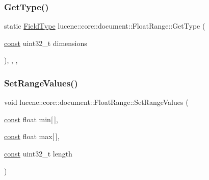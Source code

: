 \subsubsection{\texorpdfstring{Get\+Type()}{GetType()}}
{\footnotesize\ttfamily static \mbox{\hyperlink{classlucene_1_1core_1_1document_1_1FieldType}{Field\+Type}} lucene\+::core\+::document\+::\+Float\+Range\+::\+Get\+Type (\begin{DoxyParamCaption}\item[{\mbox{\hyperlink{ZlibCrc32_8h_a2c212835823e3c54a8ab6d95c652660e}{const}} uint32\+\_\+t}]{dimensions }\end{DoxyParamCaption})\hspace{0.3cm}{\ttfamily [inline]}, {\ttfamily [static]}, {\ttfamily [private]}, {\ttfamily [noexcept]}}

\mbox{\label{classlucene_1_1core_1_1document_1_1FloatRange_af9827075d0e5277455e9cadd16e79f6d}} 
\subsubsection{\texorpdfstring{Set\+Range\+Values()}{SetRangeValues()}}
{\footnotesize\ttfamily void lucene\+::core\+::document\+::\+Float\+Range\+::\+Set\+Range\+Values (\begin{DoxyParamCaption}\item[{\mbox{\hyperlink{ZlibCrc32_8h_a2c212835823e3c54a8ab6d95c652660e}{const}} float}]{min\mbox{[}$\,$\mbox{]},  }\item[{\mbox{\hyperlink{ZlibCrc32_8h_a2c212835823e3c54a8ab6d95c652660e}{const}} float}]{max\mbox{[}$\,$\mbox{]},  }\item[{\mbox{\hyperlink{ZlibCrc32_8h_a2c212835823e3c54a8ab6d95c652660e}{const}} uint32\+\_\+t}]{length }\end{DoxyParamCaption})\hspace{0.3cm}{\ttfamily [inline]}}

\mbox{\label{classlucene_1_1core_1_1document_1_1FloatRange_aa0179c3af6585d4e262298013d543093}} 
